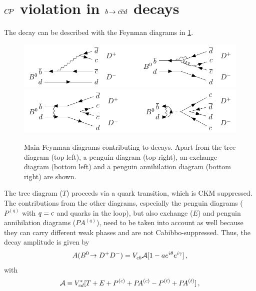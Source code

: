 
\section{\texorpdfstring{${C\!P}$}{CP} violation in \texorpdfstring{${b}\!\rightarrow {\ensuremath{c}}{\ensuremath{\overline {{c}}}}{\ensuremath{d}}$}{bToccbard} decays}
\label{sec:cpviolation:btoccbard}

The decay \BdToDD can be described with the Feynman diagrams in
\cref{fig:cpviolation:feynmandiagrams_bdtodd}.
\begin{figure}[htb]
\centering
\includegraphics[width=\textwidth]{03-CPViolation/tikz/pdf/BdToDD_Feynmans.pdf}
\includegraphics[width=\textwidth]{03-CPViolation/tikz/pdf/BdToDD_Feynmans2.pdf}
\caption{Main Feynman diagrams contributing to \BdToDD decays. Apart from the
tree diagram (top left), a penguin diagram (top right), an exchange diagram
(bottom left) and a penguin annihilation diagram (bottom right) are shown.}
\label{fig:cpviolation:feynmandiagrams_bdtodd}
\end{figure}
The tree diagram ($T$) proceeds via a \bToccbard quark transition, which is
CKM suppressed. The contributions from the other diagrams, especially the
penguin diagrams ($P^{(q)}$ with $q = {c}$ and \tquark quarks in the
loop), but also exchange ($E$) and penguin annihilation diagrams
($P\!A^{(q)}$), need to be taken into account as well because they can carry
different weak phases and are not Cabibbo-suppressed. Thus, the decay
amplitude is given by~\cite{Fleischer1999,Fleischer2007,Bel:2015wha}
\begin{align}
	A({{B}^0}\!\rightarrow {\ensuremath{{D}^+}}{\ensuremath{{D}^-}}) = {V_{{c}{b}}^{}} \mathcal{A}[1 - ae^{i\theta}e^{i\gamma}]\,,
\end{align}
with
\begin{align}
	\mathcal{A} \equiv {\ensuremath{V_{{c}{d}}^\ast}}[T + E + {P^{(c)} + P\!A^{(c)}} - {P^{(t)} + P\!A^{(t)}}]\,,
\end{align}
